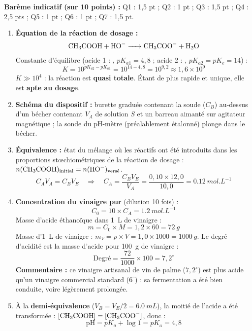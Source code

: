 \documentclass[11pt]{article}
\newcommand{\cle}[1]{{\popxbold\color{popdark}#1}}
\begin{document}
\begin{corrige}
\textbf{Barème indicatif (sur 10 points) :} Q1 : 1,5 pt ; Q2 : 1 pt ; Q3 : 1,5 pt ; Q4 : 2,5 pts ; Q5 : 1 pt ; Q6 : 1 pt ; Q7 : 1,5 pt.

\begin{enumerate}
\item \textbf{Équation de la réaction de dosage :}
\[ \ce{CH3COOH + HO- -> CH3COO- + H2O} \]
Constante d'équilibre (acide 1 : , $pK_{a1} = 4{,}8$ ; acide 2 : , $pK_{a2} = pK_e = 14$) :
\[ K = 10^{pK_{a2} - pK_{a1}} = 10^{14 - 4{,}8} = 10^{9{,}2} \approx 1{,}6\times10^{9} \]
$K \gg 10^{4}$ : la réaction est \textbf{quasi totale}. Étant de plus rapide et unique, elle est \textbf{apte au dosage}.

\item \textbf{Schéma du dispositif :} burette graduée contenant la soude ($C_B$) au-dessus d'un bécher contenant $V_A$ de solution $S$ et un barreau aimanté sur agitateur magnétique ; la sonde du pH-mètre (préalablement étalonné) plonge dans le bécher.

\item \textbf{Équivalence :} état du mélange où les réactifs ont été introduits dans les proportions stœchiométriques de la réaction de dosage : $n(\ce{CH3COOH})_{\text{initial}} = n(\ce{HO-})_{\text{versé}}$.
\[ C_A V_A = C_B V_E \quad \Rightarrow \quad C_A = \frac{C_B V_E}{V_A} = \frac{0{,}10 \times 12{,}0}{10{,}0} = \SI{0,12}{mol.L^{-1}} \]

\item \textbf{Concentration du vinaigre pur} (dilution 10 fois) :
\[ C_0 = 10 \times C_A = \SI{1,2}{mol.L^{-1}} \]
Masse d'acide éthanoïque dans \SI{1}{L} de vinaigre :
\[ m = C_0 \times M = 1{,}2 \times 60 = \SI{72}{g} \]
Masse d'\SI{1}{L} de vinaigre : $m_V = \rho \times V = 1{,}0 \times 1000 = \SI{1000}{g}$.
Le \cle{degré d'acidité} est la masse d'acide pour \SI{100}{g} de vinaigre :
\[ \text{Degré} = \frac{72}{1000} \times 100 = \boxed{7{,}2^{\circ}} \]
\textbf{Commentaire :} ce vinaigre artisanal de vin de palme ($7{,}2^{\circ}$) est plus acide qu'un vinaigre commercial standard ($6^{\circ}$) : sa fermentation a été bien conduite, voire légèrement prolongée.

\item À la \textbf{demi-équivalence} ($V_B = V_E/2 = \SI{6,0}{mL}$), la moitié de l'acide a été transformée : $[\ce{CH3COOH}] = [\ce{CH3COO-}]$, donc :
\[ \mathrm{pH} = pK_a + \log 1 = pK_a = \boxed{4{,}8} \]


\end{enumerate}
\end{corrige}
\end{document}
